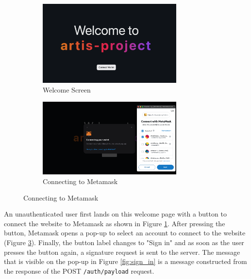 \begin{figure}[h]
    \centering
    \begin{subfigure}{\textwidth}
        \centering
        \includegraphics[width=0.8\textwidth]{resources/frontend_screenshots/welcome_screen.png}
        \caption{Welcome Screen}
        \label{fig:welcome_screen}
        \vspace*{2mm}
    \end{subfigure}
    \begin{subfigure}{\textwidth}
        \centering
        \includegraphics[width=0.8\textwidth]{resources/frontend_screenshots/connecting_wallet.png}
        \caption{Connecting to Metamask}
        \label{fig:connecting_metamask}
    \end{subfigure}
\end{figure}

An unauthenticated user first lands on this welcome page with a button to connect the website to Metamask as shown in Figure \ref{fig:welcome_screen}. After pressing the button, Metamask opens a pop-up to select an account to connect to the website (Figure \ref{fig:connecting_metamask}). Finally, the button label changes to "Sign in" and as soon as the user presses the button again, a signature request is sent to the server. The message that is visible on the pop-up in Figure \ref{fig:sign_in} is a message constructed from the response of the POST \texttt{/auth/payload} request.

